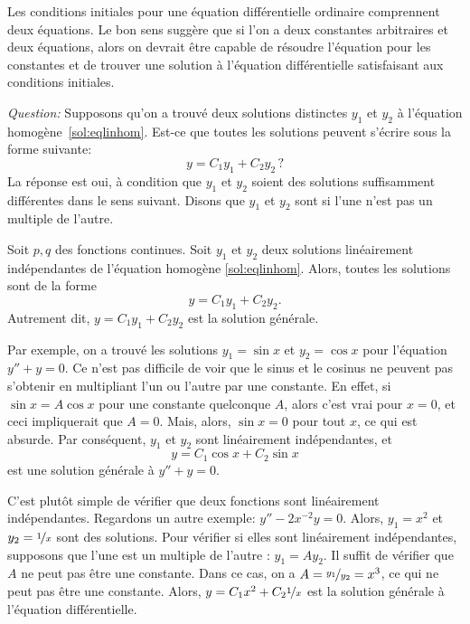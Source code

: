 \medskip

Les conditions initiales pour une équation différentielle ordinaire comprennent deux équations. Le bon sens suggère que si l'on a deux constantes arbitraires et deux équations, alors on devrait être capable de résoudre l'équation pour les constantes et de trouver une solution à l'équation différentielle satisfaisant aux conditions initiales. 

\emph{Question:} Supposons qu'on a trouvé deux solutions distinctes $y_1$ et $y_2$ à l'équation homogène~\eqref{sol:eqlinhom}.  Est-ce que toutes les solutions peuvent s'écrire sous la forme suivante:
\begin{equation*}
	y = C_1 y_1 + C_2 y_2\,?
\end{equation*}
La réponse est oui, à condition que $y_1$ et $y_2$ soient des solutions suffisamment différentes dans le sens suivant.  Disons que $y_1$ et $y_2$ sont \emph{} si l'une n'est pas un multiple de l'autre.

\begin{theorem}
	Soit $p, q$ des fonctions continues.
	Soit $y_1$ et $y_2$ deux solutions linéairement indépendantes de l'équation homogène \eqref{sol:eqlinhom}. 
	Alors, toutes les solutions sont de la forme 
	\begin{equation*}
		y = C_1 y_1 + C_2 y_2 .
	\end{equation*}
	Autrement dit, $y = C_1 y_1 + C_2 y_2$ est la solution générale.
\end{theorem}

Par exemple, on a trouvé les solutions 
$y_1 = \sin x$ et $y_2 = \cos x$ pour l'équation $y'' + y = 0$.  Ce n'est pas difficile de voir que le sinus et le cosinus ne peuvent pas s'obtenir en multipliant l'un ou l'autre par une constante.
En effet, si $\sin x = A \cos x$ pour une constante quelconque $A$,
alors c'est vrai pour $x=0$, et ceci impliquerait que  $A = 0$.  
Mais, alors, $\sin x = 0$ pour tout $x$, ce qui est absurde.
Par conséquent, $y_1$ et $y_2$ sont linéairement indépendantes, et
\begin{equation*}
	y = C_1 \cos x + C_2 \sin x 
\end{equation*}
est une solution générale à $y'' + y = 0$.


C'est plutôt simple de vérifier que deux fonctions sont linéairement indépendantes. 
Regardons un autre exemple:    $y''-2x^{-2}y = 0$.  
Alors, $y_1 = x^2$ et $y_2 = \nicefrac{1}{x}$ sont des solutions.  
Pour vérifier si elles sont linéairement indépendantes, supposons que l'une est un  multiple de l'autre : 
$y_1 = A y_2$.  Il suffit de vérifier que  $A$ ne peut pas être une constante.  
Dans ce cas, on a $A = \nicefrac{y_1}{y_2} = x^3$, ce qui ne peut pas être une constante. 
Alors, $y = C_1 x^2 + C_2 \nicefrac{1}{x}$ est la solution générale à l'équation différentielle.

